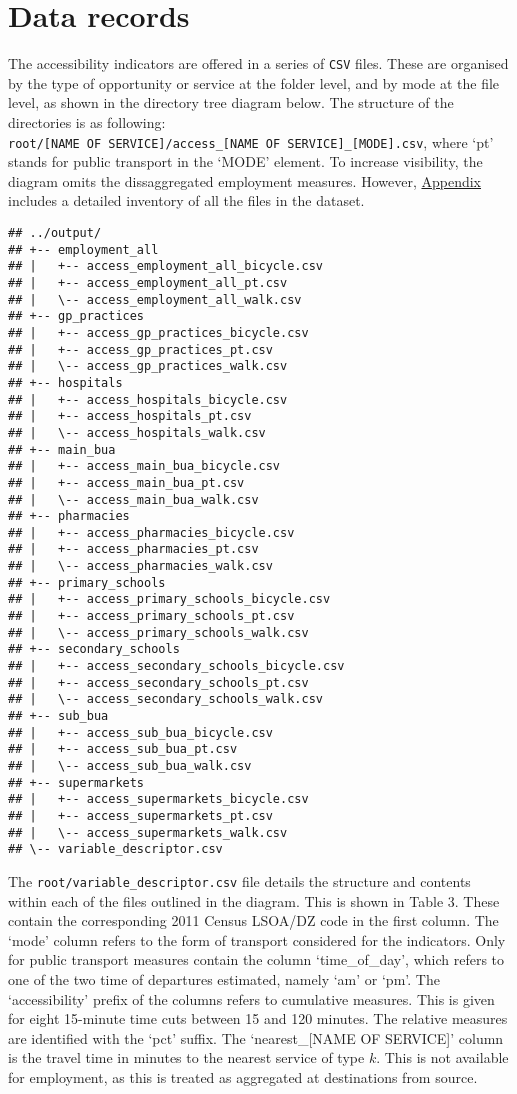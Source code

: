 \documentclass{article}
\begin{document}
\hypertarget{data-records}{%
\section{Data records}\label{data-records}}

The accessibility indicators are offered in a series of \texttt{CSV}
files. These are organised by the type of opportunity or service at the
folder level, and by mode at the file level, as shown in the directory
tree diagram below. The structure of the directories is as following:
\texttt{root/{[}NAME\ OF\ SERVICE{]}/access\_{[}NAME\ OF\ SERVICE{]}\_{[}MODE{]}.csv},
where `pt' stands for public transport in the `MODE' element. To
increase visibility, the diagram omits the dissaggregated employment
measures. However, \protect\hyperlink{inventory}{Appendix} includes a
detailed inventory of all the files in the dataset.

\begin{verbatim}
## ../output/
## +-- employment_all
## |   +-- access_employment_all_bicycle.csv
## |   +-- access_employment_all_pt.csv
## |   \-- access_employment_all_walk.csv
## +-- gp_practices
## |   +-- access_gp_practices_bicycle.csv
## |   +-- access_gp_practices_pt.csv
## |   \-- access_gp_practices_walk.csv
## +-- hospitals
## |   +-- access_hospitals_bicycle.csv
## |   +-- access_hospitals_pt.csv
## |   \-- access_hospitals_walk.csv
## +-- main_bua
## |   +-- access_main_bua_bicycle.csv
## |   +-- access_main_bua_pt.csv
## |   \-- access_main_bua_walk.csv
## +-- pharmacies
## |   +-- access_pharmacies_bicycle.csv
## |   +-- access_pharmacies_pt.csv
## |   \-- access_pharmacies_walk.csv
## +-- primary_schools
## |   +-- access_primary_schools_bicycle.csv
## |   +-- access_primary_schools_pt.csv
## |   \-- access_primary_schools_walk.csv
## +-- secondary_schools
## |   +-- access_secondary_schools_bicycle.csv
## |   +-- access_secondary_schools_pt.csv
## |   \-- access_secondary_schools_walk.csv
## +-- sub_bua
## |   +-- access_sub_bua_bicycle.csv
## |   +-- access_sub_bua_pt.csv
## |   \-- access_sub_bua_walk.csv
## +-- supermarkets
## |   +-- access_supermarkets_bicycle.csv
## |   +-- access_supermarkets_pt.csv
## |   \-- access_supermarkets_walk.csv
## \-- variable_descriptor.csv
\end{verbatim}

The \texttt{root/variable\_descriptor.csv} file details the structure
and contents within each of the files outlined in the diagram. This is
shown in Table 3. These contain the corresponding 2011 Census LSOA/DZ
code in the first column. The `mode' column refers to the form of
transport considered for the indicators. Only for public transport
measures contain the column `time\_of\_day', which refers to one of the
two time of departures estimated, namely `am' or `pm'. The
`accessibility' prefix of the columns refers to cumulative measures.
This is given for eight 15-minute time cuts between 15 and 120 minutes.
The relative measures are identified with the `pct' suffix. The
`nearest\_{[}NAME OF SERVICE{]}' column is the travel time in minutes to
the nearest service of type \(k\). This is not available for employment,
as this is treated as aggregated at destinations from source.
\end{document}
